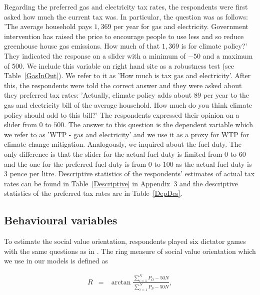\documentclass[a4paper,12pt]{article}
\begin{document}
\vspace{1cm}







Regarding the preferred gas and electricity tax rates, the respondents were first asked how much the current tax was. In particular, the question was as follows: 'The average household pays \textsterling$1,369$ per year for gas and electricity. Government intervention has raised the price to encourage people to use less and so reduce greenhouse house gas emissions. How much of that \textsterling$1,369$ is for climate policy?' They indicated the response on a slider with a minimum of $-50$ and a maximum of $500$. We include this variable on right hand site as a robustness test (see Table~\ref{GasInOut}). We refer to it as 'How much is tax gas and electricity'. After this, the respondents were told the correct answer and they were asked about they preferred tax rates: 'Actually, climate policy adds about \textsterling$89$ per year to the gas and electricity bill of the average household. How much do you think climate policy should add to this bill?' The respondents expressed their opinion on a slider from $0$ to $500$. The answer to this question is the dependent variable which we refer to as 'WTP - gas and electricity' and we use it as a proxy for WTP for climate change mitigation. Analogously, we inquired about the fuel duty. The only difference is that the slider for the actual fuel duty is limited from $0$ to $60$ and the one for the preferred fuel duty is from $0$ to $100$ as the actual fuel duty is $3$ pence per litre. Descriptive statistics of the respondents' estimates of actual tax rates can be found in Table~\ref{Descriptive} in Appendix~$3$ and the descriptive statistics of the preferred tax rates are in Table~\ref{DepDes}.

\subsection{Behavioural variables}\label{BehaviouralVars}


To estimate the social value orientation, respondents played six dictator games with the same questions as in \citet{murphy2011SVO}. The ring measure of social value orientation which we use in our models is defined as

\begin{equation}\label{RingMeasure}
\begin{array}{lcll}

R&=&\arctan \frac{\sum_{i=1}^{N} P_O -50N}{\sum_{i=1}^{N} P_S -50N}, \\
\end{array}
\end{equation}
\end{document}
